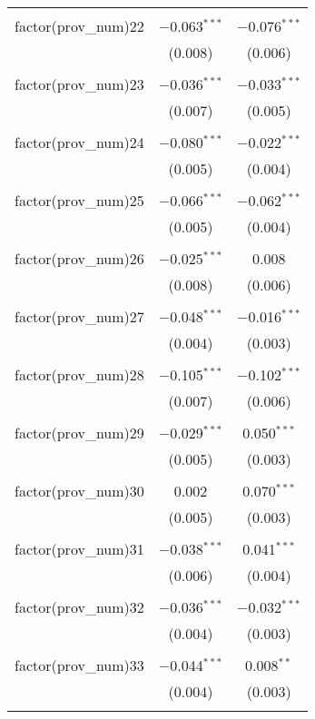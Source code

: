 \begin{table}[!htbp]
\begin{tabular}{@{\extracolsep{5pt}}lcc}
  & & \\ 
 factor(prov\_num)22 & $-$0.063$^{***}$ & $-$0.076$^{***}$ \\ 
  & (0.008) & (0.006) \\ 
  & & \\ 
 factor(prov\_num)23 & $-$0.036$^{***}$ & $-$0.033$^{***}$ \\ 
  & (0.007) & (0.005) \\ 
  & & \\ 
 factor(prov\_num)24 & $-$0.080$^{***}$ & $-$0.022$^{***}$ \\ 
  & (0.005) & (0.004) \\ 
  & & \\ 
 factor(prov\_num)25 & $-$0.066$^{***}$ & $-$0.062$^{***}$ \\ 
  & (0.005) & (0.004) \\ 
  & & \\ 
 factor(prov\_num)26 & $-$0.025$^{***}$ & 0.008 \\ 
  & (0.008) & (0.006) \\ 
  & & \\ 
 factor(prov\_num)27 & $-$0.048$^{***}$ & $-$0.016$^{***}$ \\ 
  & (0.004) & (0.003) \\ 
  & & \\ 
 factor(prov\_num)28 & $-$0.105$^{***}$ & $-$0.102$^{***}$ \\ 
  & (0.007) & (0.006) \\ 
  & & \\ 
 factor(prov\_num)29 & $-$0.029$^{***}$ & 0.050$^{***}$ \\ 
  & (0.005) & (0.003) \\ 
  & & \\ 
 factor(prov\_num)30 & 0.002 & 0.070$^{***}$ \\ 
  & (0.005) & (0.003) \\ 
  & & \\ 
 factor(prov\_num)31 & $-$0.038$^{***}$ & 0.041$^{***}$ \\ 
  & (0.006) & (0.004) \\ 
  & & \\ 
 factor(prov\_num)32 & $-$0.036$^{***}$ & $-$0.032$^{***}$ \\ 
  & (0.004) & (0.003) \\ 
  & & \\ 
 factor(prov\_num)33 & $-$0.044$^{***}$ & 0.008$^{**}$ \\ 
  & (0.004) & (0.003) \\ 
  & & \\ 

\end{tabular}
\end{table}
